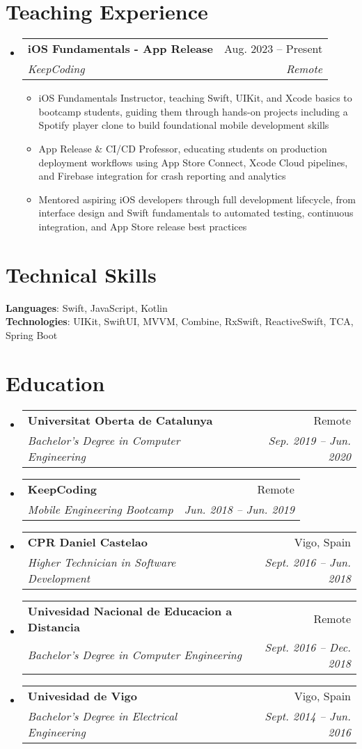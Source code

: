 \documentclass[letterpaper,11pt]{article}
\makeatletter
\newcommand{\resumeItem}[1]{
  \item\small{
    {#1 \vspace{-2pt}}
  }
}
\newcommand{\resumeSubheading}[4]{
  \vspace{-2pt}\item
    \begin{tabular*}{0.97\textwidth}[t]{l@{\extracolsep{\fill}}r}
      \textbf{#1} & #2 \\
      \textit{\small#3} & \textit{\small #4} \\
    \end{tabular*}\vspace{-7pt}
}
\newcommand{\resumeSubHeadingListStart}{\begin{itemize}[leftmargin=0.15in, label={}]}
\newcommand{\resumeSubHeadingListEnd}{\end{itemize}}
\newcommand{\resumeItemListStart}{\begin{itemize}}
\newcommand{\resumeItemListEnd}{\end{itemize}\vspace{-5pt}}
\makeatother
\begin{document}
\section{Teaching Experience}
    \resumeSubHeadingListStart
      \resumeSubheading
        {iOS Fundamentals - App Release}{Aug. 2023 -- Present}	
        {KeepCoding}{Remote}
        \resumeItemListStart
          \resumeItem{iOS Fundamentals Instructor, teaching Swift, UIKit, and Xcode basics to bootcamp students, guiding them through hands-on projects including a Spotify player clone to build foundational mobile development skills}
          \resumeItem{App Release \& CI/CD Professor, educating students on production deployment workflows using App Store Connect, Xcode Cloud pipelines, and Firebase integration for crash reporting and analytics}
          \resumeItem{Mentored aspiring iOS developers through full development lifecycle, from interface design and Swift fundamentals to automated testing, continuous integration, and App Store release best practices}
        \resumeItemListEnd
    \resumeSubHeadingListEnd


\section{Technical Skills}
 \begin{itemize}[leftmargin=0.15in, label={}]
    \small{\item{
     \textbf{Languages}{: Swift, JavaScript, Kotlin} \\
     \textbf{Technologies}{: UIKit, SwiftUI, MVVM, Combine, RxSwift, ReactiveSwift, TCA, Spring Boot} \\
    }}
 \end{itemize}
 
\section{Education}
  \resumeSubHeadingListStart
    \resumeSubheading
      {Universitat Oberta de Catalunya}{Remote}
      {Bachelor's Degree in Computer Engineering}{Sep. 2019 -- Jun. 2020}
    \resumeSubheading
      {KeepCoding}{Remote}
      {Mobile Engineering Bootcamp}{Jun. 2018 -- Jun. 2019}
    \resumeSubheading
      {CPR Daniel Castelao}{Vigo, Spain}
      {Higher Technician in Software Development}{Sept. 2016 -- Jun. 2018}
    \resumeSubheading
      {Univesidad Nacional de Educacion a Distancia}{Remote}
      {Bachelor's Degree in Computer Engineering}{Sept. 2016 -- Dec. 2018}
    \resumeSubheading
      {Univesidad de Vigo}{Vigo, Spain}
      {Bachelor's Degree in Electrical Engineering}{Sept. 2014 -- Jun. 2016}
  \resumeSubHeadingListEnd

\end{document}

